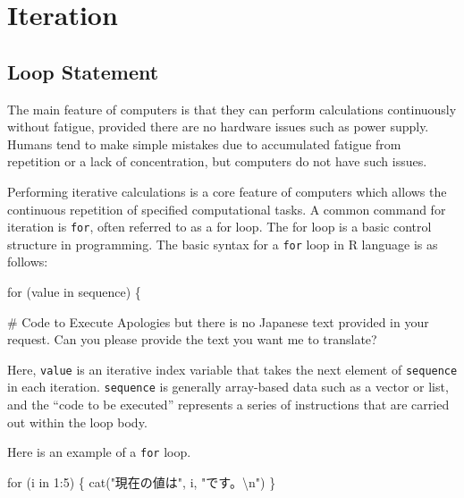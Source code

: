\documentclass[
  a4paper,
]{book}
\newenvironment{Shaded}{\begin{snugshade}}{\end{snugshade}}
\newcommand{\CommentTok}[1]{\textcolor[rgb]{0.37,0.37,0.37}{#1}}
\newcommand{\ControlFlowTok}[1]{\textcolor[rgb]{0.00,0.23,0.31}{#1}}
\newcommand{\DecValTok}[1]{\textcolor[rgb]{0.68,0.00,0.00}{#1}}
\newcommand{\FunctionTok}[1]{\textcolor[rgb]{0.28,0.35,0.67}{#1}}
\newcommand{\NormalTok}[1]{\textcolor[rgb]{0.00,0.23,0.31}{#1}}
\newcommand{\SpecialCharTok}[1]{\textcolor[rgb]{0.37,0.37,0.37}{#1}}
\newcommand{\StringTok}[1]{\textcolor[rgb]{0.13,0.47,0.30}{#1}}
\begin{document}
\section{Iteration}\label{iteration}

\subsection{Loop Statement}\label{loop-statement}

The main feature of computers is that they can perform calculations
continuously without fatigue, provided there are no hardware issues such
as power supply. Humans tend to make simple mistakes due to accumulated
fatigue from repetition or a lack of concentration, but computers do not
have such issues.

Performing iterative calculations is a core feature of computers which
allows the continuous repetition of specified computational tasks. A
common command for iteration is \texttt{for}, often referred to as a for
loop. The for loop is a basic control structure in programming. The
basic syntax for a \texttt{for} loop in R language is as follows:

\begin{Shaded}
\begin{Highlighting}[]
\ControlFlowTok{for}\NormalTok{ (value }\ControlFlowTok{in}\NormalTok{ sequence) \{}

    \CommentTok{\# Code to Execute}
\NormalTok{Apologies but there is no Japanese text provided }\ControlFlowTok{in}\NormalTok{ your request. Can you please provide the text you want me to translate?}
\end{Highlighting}
\end{Shaded}

Here, \texttt{value} is an iterative index variable that takes the next
element of \texttt{sequence} in each iteration. \texttt{sequence} is
generally array-based data such as a vector or list, and the ``code to
be executed'' represents a series of instructions that are carried out
within the loop body.

Here is an example of a \texttt{for} loop.

\begin{Shaded}
\begin{Highlighting}[]
\ControlFlowTok{for}\NormalTok{ (i }\ControlFlowTok{in} \DecValTok{1}\SpecialCharTok{:}\DecValTok{5}\NormalTok{) \{}
  \FunctionTok{cat}\NormalTok{(}\StringTok{"現在の値は"}\NormalTok{, i, }\StringTok{"です。}\SpecialCharTok{\textbackslash{}n}\StringTok{"}\NormalTok{)}
\NormalTok{\}}
\end{Highlighting}
\end{Shaded}
\end{document}
